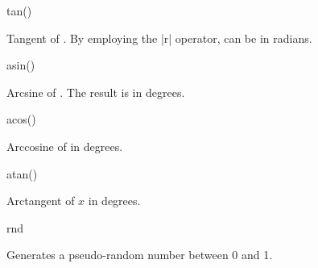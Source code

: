 \begin{math-function}{tan()}

	Tangent of . By employing the |r| operator,  can be in 
	radians.
	
\begin{codeexample}[post=\tt\footnotesize\pgfmathresult]
\end{codeexample}

\begin{codeexample}[post=\tt\footnotesize\pgfmathresult]
\end{codeexample}

\end{math-function}

\begin{math-function}{asin()}

	Arcsine of . The result is in degrees.

\begin{codeexample}[post=\tt\footnotesize\pgfmathresult]
\end{codeexample}

\end{math-function}

\begin{math-function}{acos()}

	Arccosine of  in degrees.  

\begin{codeexample}[post=\tt\footnotesize\pgfmathresult]
\end{codeexample}

\end{math-function}

\begin{math-function}{atan()}

	Arctangent of $x$ in degrees. 

\begin{codeexample}[post=\tt\footnotesize\pgfmathresult]
\end{codeexample}

\end{math-function}

\begin{math-function}{rnd}

	Generates a pseudo-random number between 0 and 1.

\begin{codeexample}[post=\tt\footnotesize\pgfmathresult]
\end{codeexample}

\begin{codeexample}[post=\tt\footnotesize\pgfmathresult]
\end{codeexample}

\begin{codeexample}[post=\tt\footnotesize\pgfmathresult]
\end{codeexample}

\end{math-function}

